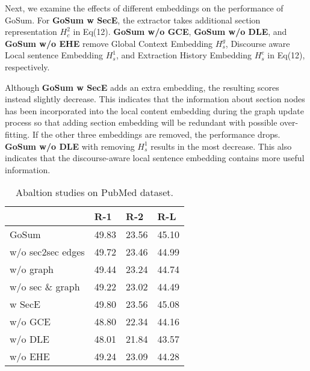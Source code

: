Next, we examine the effects of different embeddings on the performance of GoSum.
For \textbf{GoSum w SecE}, the extractor takes additional section representation $H_c^2$ in Eq(12).
\textbf{GoSum w/o GCE}, \textbf{GoSum w/o DLE}, and \textbf{GoSum w/o EHE}
remove Global Context Embedding $H_s^g$, Discourse aware Local sentence Embedding $H_s^1$, and Extraction History Embedding $H_s^e$ in Eq(12), respectively.

Although \textbf{GoSum w SecE} adds an extra embedding, the resulting scores instead slightly decrease. This indicates that the information about section nodes has been incorporated into the local content embedding during the graph update process so that adding section embedding will be redundant with possible over-fitting.
If the other three embeddings are removed, the performance drops. \textbf{GoSum w/o DLE} with removing $H_s^1$ results in the most decrease. This  also indicates that the discourse-aware local sentence embedding contains more useful information.

\begin{table}[t]
  \centering
  \begin{tabular}{l|p{13mm}p{13mm}p{13mm}}\toprule
                              & \hfil R-1  & \hfil R-2  & \hfil R-L    \\ \midrule
        GoSum                 & \hfil 49.83 & \hfil 23.56 & \hfil 45.10   \\ \midrule
        \quad w/o sec2sec edges     & \hfil 49.72 & \hfil 23.46 & \hfil 44.99   \\
        \quad w/o graph             & \hfil 49.44 & \hfil 23.24 & \hfil 44.74   \\
        \quad w/o sec \& graph      & \hfil 49.22 & \hfil 23.02 & \hfil 44.49   \\ \midrule
        \quad w   SecE              & \hfil 49.80 & \hfil 23.56 & \hfil 45.08   \\
        \quad w/o GCE               & \hfil 48.80 & \hfil 22.34 & \hfil 44.16   \\
        \quad w/o DLE               & \hfil 48.01 & \hfil 21.84 & \hfil 43.57   \\
        \quad w/o EHE               & \hfil 49.24 & \hfil 23.09 & \hfil 44.28   \\ \bottomrule
  \end{tabular}
  \caption{Abaltion studies on PubMed dataset.} \label{tab:ablation_pubmed}
\end{table}
